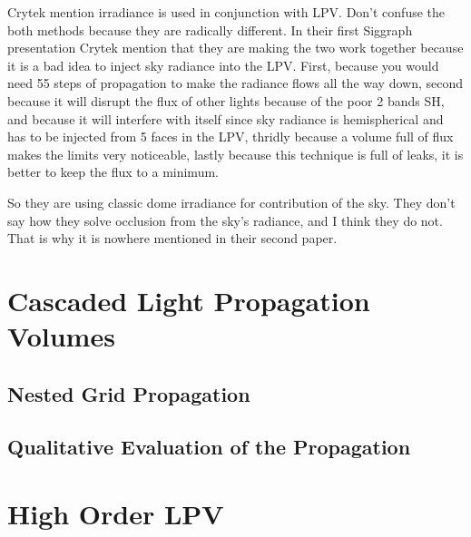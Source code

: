 Crytek mention irradiance is used in conjunction with LPV. Don't confuse the both methods because they are radically different. In their first Siggraph presentation Crytek mention that they are making the two work together because it is a bad idea to inject sky radiance into the LPV. First, because you would need 55 steps of propagation to make the radiance flows all the way down, second because it will disrupt the flux of other lights because of the poor 2 bands SH, and because it will interfere with itself since sky radiance is hemispherical and has to be injected from 5 faces in the LPV, thridly because a volume full of flux makes the limits very noticeable, lastly because this technique is full of leaks, it is better to keep the flux to a minimum.

So they are using classic dome irradiance for contribution of the sky. They don't say how they solve occlusion from the sky's radiance, and I think they do not. That is why it is nowhere mentioned in their second paper.

%
\section{Cascaded Light Propagation Volumes}
\subsection{Nested Grid Propagation}
\subsection{Qualitative Evaluation of the Propagation}
\section{High Order LPV}
%





























